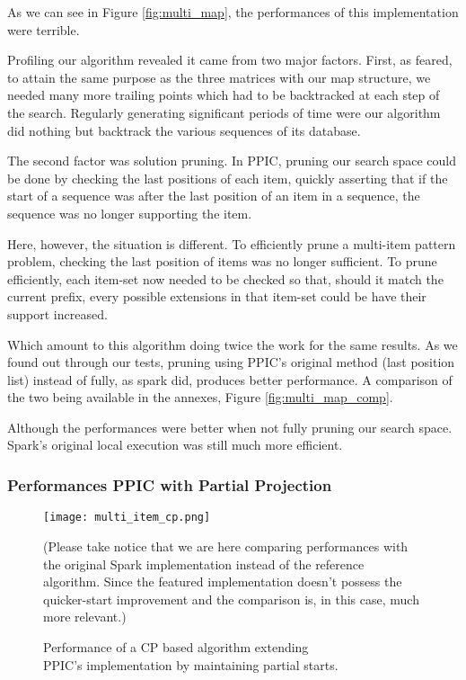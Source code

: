 \documentclass{eplmastersthesis}
\begin{document}
As we can see in Figure \ref{fig:multi_map}, the performances of this implementation were terrible. \newline

Profiling our algorithm revealed it came from two major factors. First, as feared, to attain the same purpose as the three matrices with our map structure, we needed many more trailing points which had to be backtracked at each step of the search. Regularly generating significant periods of time were our algorithm did nothing but backtrack the various sequences of its database. \newline

The second factor was solution pruning. In PPIC, pruning our search space could be done by checking the last positions of each item, quickly asserting that if the start of a sequence was after the last position of an item in a sequence, the sequence was no longer supporting the item. \newline

Here, however, the situation is different. To efficiently prune a multi-item pattern problem, checking the last position of items was no longer sufficient. To prune efficiently, each item-set now needed to be checked so that, should it match the current prefix, every possible extensions in that item-set could be have their support increased. \newline

Which amount to this algorithm doing twice the work for the same results. As we found out through our tests, pruning using PPIC's original method (last position list) instead of fully, as spark did, produces better performance. A comparison of the two being available in the annexes, Figure \ref{fig:multi_map_comp}. \newline

Although the performances were better when not fully pruning our search space. Spark's original local execution was still much more efficient.

\subsubsection{Performances PPIC with Partial Projection}

\begin{figure}[h]
  \centering
  \texttt{[image: multi\_item\_cp.png]}
  \caption[PPIC with partial starts]{
  		Performance of a CP based algorithm extending \\
  		PPIC's implementation by maintaining partial starts.
  	\endtabular
  }
  \label{fig:multi_array}
  (Please take notice that we are here comparing performances with the original Spark implementation instead of the reference algorithm. Since the featured implementation doesn't possess the quicker-start improvement and the comparison is, in this case, much more relevant.)
\end{figure}
\end{document}
